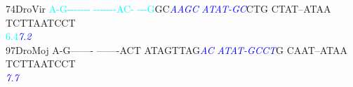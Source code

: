 \documentclass[11pt,twoside,reqno,a4paper]{article}
\begin{document}
{74\hspace*{2\charwidth}DroVir	\textcolor{cyan}{A}\textcolor{cyan}{-}\textcolor{cyan}{G}\textcolor{cyan}{-}\textcolor{cyan}{-}\textcolor{cyan}{-}\textcolor{cyan}{-}\textcolor{cyan}{-}\textcolor{cyan}{-}\textcolor{cyan}{-}	\textcolor{cyan}{-}\textcolor{cyan}{-}\textcolor{cyan}{-}\textcolor{cyan}{-}\textcolor{cyan}{-}\textcolor{cyan}{-}\textcolor{cyan}{-}\textcolor{cyan}{A}\textcolor{cyan}{C}\textcolor{cyan}{-}	\textcolor{cyan}{-}\textcolor{cyan}{-}\textcolor{cyan}{-}\textcolor{cyan}{G}GC\textit{\textcolor{blue}{A}}\textit{\textcolor{blue}{A}}\textit{\textcolor{blue}{G}}\textit{\textcolor{blue}{C}}	\textit{\textcolor{blue}{A}}\textit{\textcolor{blue}{T}}\textit{\textcolor{blue}{A}}\textit{\textcolor{blue}{T}}\textit{\textcolor{blue}{-}}\textit{\textcolor{blue}{G}}\textit{\textcolor{blue}{C}}CTG	CTAT--ATAA	TCTTAATCCT	\\
\hspace*{4\charwidth}\hspace*{7\charwidth}\hspace*{0\charwidth}\textcolor{cyan}{6.4}\hspace*{1\charwidth}\hspace*{1\charwidth}\hspace*{23\charwidth}\textit{\textcolor{blue}{7.2}}\hspace*{1\charwidth}\hspace*{1\charwidth}\hspace*{1\charwidth}\hspace*{1\charwidth}\\
97\hspace*{2\charwidth}DroMoj	A-G-------	-------ACT	ATAGTTAG\textit{\textcolor{blue}{A}}\textit{\textcolor{blue}{C}}	\textit{\textcolor{blue}{A}}\textit{\textcolor{blue}{T}}\textit{\textcolor{blue}{A}}\textit{\textcolor{blue}{T}}\textit{\textcolor{blue}{-}}\textit{\textcolor{blue}{G}}\textit{\textcolor{blue}{C}}\textit{\textcolor{blue}{C}}\textit{\textcolor{blue}{T}}G	CAAT--ATAA	TCTTAATCCT	\\
\hspace*{4\charwidth}\hspace*{7\charwidth}\hspace*{1\charwidth}\hspace*{1\charwidth}\hspace*{28\charwidth}\textit{\textcolor{blue}{7.7}}\hspace*{1\charwidth}\hspace*{1\charwidth}\hspace*{1\charwidth}\hspace*{1\charwidth}\\
}
\end{document}
